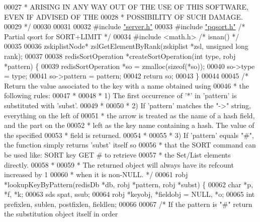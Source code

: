 \begin{DoxyCode}
00027 \textcolor{comment}{ * ARISING IN ANY WAY OUT OF THE USE OF THIS SOFTWARE, EVEN IF ADVISED OF THE}
00028 \textcolor{comment}{ * POSSIBILITY OF SUCH DAMAGE.}
00029 \textcolor{comment}{ */}
00030 
00031 
00032 \textcolor{preprocessor}{#}\textcolor{preprocessor}{include} \hyperlink{server_8h}{"server.h"}
00033 \textcolor{preprocessor}{#}\textcolor{preprocessor}{include} \hyperlink{pqsort_8h}{"pqsort.h"}           \textcolor{comment}{/* Partial qsort for SORT+LIMIT */}
00034 \textcolor{preprocessor}{#}\textcolor{preprocessor}{include} \textcolor{preprocessor}{<}\textcolor{preprocessor}{math}\textcolor{preprocessor}{.}\textcolor{preprocessor}{h}\textcolor{preprocessor}{>} \textcolor{comment}{/* isnan() */}
00035 
00036 zskiplistNode* zslGetElementByRank(zskiplist *zsl, \textcolor{keywordtype}{unsigned} \textcolor{keywordtype}{long} rank);
00037 
00038 redisSortOperation *createSortOperation(\textcolor{keywordtype}{int} type, robj *pattern) \{
00039     redisSortOperation *so = zmalloc(\textcolor{keyword}{sizeof}(*so));
00040     so->type = type;
00041     so->pattern = pattern;
00042     \textcolor{keywordflow}{return} so;
00043 \}
00044 
00045 \textcolor{comment}{/* Return the value associated to the key with a name obtained using}
00046 \textcolor{comment}{ * the following rules:}
00047 \textcolor{comment}{ *}
00048 \textcolor{comment}{ * 1) The first occurrence of '*' in 'pattern' is substituted with 'subst'.}
00049 \textcolor{comment}{ *}
00050 \textcolor{comment}{ * 2) If 'pattern' matches the "->" string, everything on the left of}
00051 \textcolor{comment}{ *    the arrow is treated as the name of a hash field, and the part on the}
00052 \textcolor{comment}{ *    left as the key name containing a hash. The value of the specified}
00053 \textcolor{comment}{ *    field is returned.}
00054 \textcolor{comment}{ *}
00055 \textcolor{comment}{ * 3) If 'pattern' equals "#", the function simply returns 'subst' itself so}
00056 \textcolor{comment}{ *    that the SORT command can be used like: SORT key GET # to retrieve}
00057 \textcolor{comment}{ *    the Set/List elements directly.}
00058 \textcolor{comment}{ *}
00059 \textcolor{comment}{ * The returned object will always have its refcount increased by 1}
00060 \textcolor{comment}{ * when it is non-NULL. */}
00061 robj *lookupKeyByPattern(redisDb *db, robj *pattern, robj *subst) \{
00062     \textcolor{keywordtype}{char} *p, *f, *k;
00063     sds spat, ssub;
00064     robj *keyobj, *fieldobj = NULL, *o;
00065     \textcolor{keywordtype}{int} prefixlen, sublen, postfixlen, fieldlen;
00066 
00067     \textcolor{comment}{/* If the pattern is "#" return the substitution object itself in order}

\end{DoxyCode}
